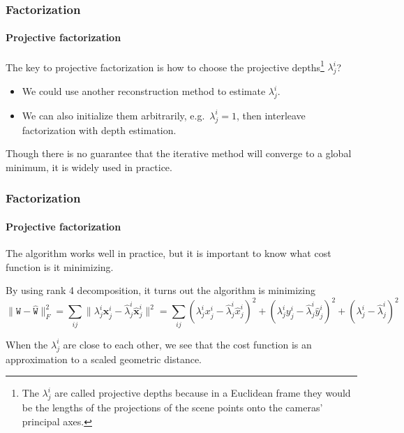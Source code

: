 \documentclass[aspectratio=169]{beamer}
\renewcommand{\vec}[1]{\boldsymbol{#1}}
\newcommand{\mat}[1]{\mathtt{#1}}
\begin{document}
\begin{frame}
\frametitle{Factorization}
\framesubtitle{Projective factorization}

The key to projective factorization is how to choose the
\alert{projective depths}\footnote{The $\lambda_j^i$ are called
projective depths because in a Euclidean frame they would be the
lengths of the projections of the scene points onto the cameras'
principal axes.}  $\lambda_j^i$?
\begin{itemize}
\item We could use another reconstruction method to estimate
  $\lambda_j^i$.
\item We can also initialize them arbitrarily, e.g.\ $\lambda_j^i=1$,
  then \alert{interleave} factorization with depth estimation.
\end{itemize}

\medskip

Though there is no guarantee that the iterative method will converge
to a global minimum, it is widely used in practice.

\end{frame}

\begin{frame}
\frametitle{Factorization}
\framesubtitle{Projective factorization}

The algorithm works well in practice, but it is important to
know \alert{what cost function} is it minimizing.

\medskip

By using rank 4 decomposition, it turns out the algorithm is
minimizing
\begin{equation*}
\|\mat{W}-\hat{\mat{W}}\|_F^2 =
\sum_{ij} \|\lambda_j^i\vec{x}_j^i - \hat{\lambda}_j^i\hat{\vec{x}}_j^i\|^2 =
\sum_{ij} (\lambda_j^ix_j^i - \hat{\lambda}_j^i\hat{x}_j^i)^2 +
          (\lambda_j^iy_j^i - \hat{\lambda}_j^i\hat{y}_j^i)^2 +
          (\lambda_j^i - \hat{\lambda}_j^i)^2
\end{equation*} 

When the $\lambda_j^i$ are close to each other, we see that the cost
function is an \alert{approximation to a scaled geometric distance}.

\end{frame}
\end{document}
